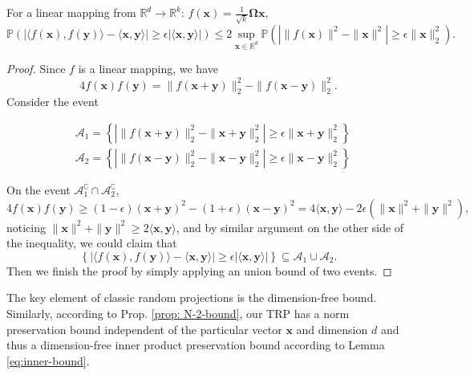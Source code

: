 \begin{lem}
\label{lemma:inner-product}
For a linear mapping from $\mathbb{R}^d\rightarrow \mathbb{R}^k$: $f(\mathbf{x}) = \frac{1}{\sqrt{k}}\mathbf{\Omega x}$, 
\begin{equation}
\label{eq:inner-bound}
\mathbb{P}(|\langle f(\mathbf{x}), f(\mathbf{y})\rangle - \langle \mathbf{x}, \mathbf{y}\rangle|\ge \epsilon |\langle \mathbf{x}, \mathbf{y}\rangle|) \le 2\sup_{\mathbf{x}\in \mathbb{R}^{d}}\mathbb{P}(| \|f(\mathbf{x})\|^2-\|\mathbf{x}\|^2|\ge \epsilon \|\mathbf{x}\|_2^2).\nonumber
\end{equation}
\end{lem}

\begin{proof}
Since $f$ is a linear mapping, we have
\[
4f(\mathbf{x})f(\mathbf{y}) = \|f(\mathbf{x}+\mathbf{y})\|^2_2-  \|f(\mathbf{x}-\mathbf{y})\|^2_2.
\]
Consider the event

\begin{equation}
\begin{aligned}
 &\mathcal{A} _1=  \left\{ |\|f(\mathbf{x}+\mathbf{y})\|^2_2-\|\mathbf{x}+\mathbf{y}\|^2_2|\ge \epsilon \|\mathbf{x}+\mathbf{y}\|_2^2 \right\}\\
 &\mathcal{A} _2=  \left\{ | \|f(\mathbf{x}-\mathbf{y})\|^2_2-\|\mathbf{x}-\mathbf{y}\|^2_2|\ge \epsilon \|\mathbf{x}-\mathbf{y}\|_2^2 \right\} \nonumber
 \end{aligned}
 \end{equation}
 
 On the event $\mathcal{A}_1^\complement \cap\mathcal{A}_2^\complement$, 
 \[
 4f(\mathbf{x})f(\mathbf{y})  \ge (1-\epsilon) (\mathbf{x}+\mathbf{y})^2 - (1+\epsilon) (\mathbf{x}-\mathbf{y})^2 = 4 \langle \mathbf{x}, \mathbf{y}\rangle -2\epsilon (\|\mathbf{x}\|^2+\|\mathbf{y}\|^2),
 \]
 noticing $\|\mathbf{x}\|^2+\|\mathbf{y}\|^2\ge 2\langle \mathbf{x},  \mathbf{y}\rangle$, and by similar argument on the other side of the inequality, we could claim that 
\[
\left\{|\langle f(\mathbf{x}), f(\mathbf{y})\rangle - \langle \mathbf{x}, \mathbf{y}\rangle|\ge \epsilon |\langle \mathbf{x}, \mathbf{y}\rangle|\right\} \subseteq  \mathcal{A}_1 \cup \mathcal{A}_2. 
\]
Then we finish the proof by simply applying an union bound of two events. 
\end{proof}
\begin{remark}
The key element of classic random projections is the dimension-free bound. Similarly, according to Prop. \ref{prop: N-2-bound}, our TRP has a norm preservation bound independent of the particular vector  $\mathbf{x}$ and dimension $d$ and thus a dimension-free inner product preservation bound according to Lemma \ref{eq:inner-bound}. 
\end{remark}